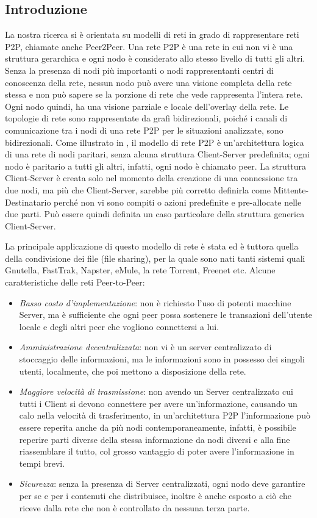 \subsection{Introduzione}
La nostra ricerca si è orientata su modelli di reti in grado di rappresentare reti \acf{P2P}, chiamate anche Peer2Peer. Una rete P2P è una rete in cui non vi è una struttura gerarchica e ogni nodo è considerato allo stesso livello di tutti gli altri. Senza la presenza di nodi più importanti o nodi rappresentanti centri di conoscenza della rete, nessun nodo può avere una visione completa della rete stessa e non può sapere se la porzione di rete che vede rappresenta l'intera rete. Ogni nodo quindi, ha una visione parziale e locale dell'overlay della rete. Le topologie di rete sono rappresentate da grafi bidirezionali, poiché i canali di comunicazione tra i nodi di una rete P2P per le situazioni analizzate, sono bidirezionali. Come illustrato in \cite{peertopeer-book}, il modello di rete P2P è un'architettura logica di una rete di nodi paritari, senza alcuna struttura Client-Server predefinita; ogni nodo è paritario a tutti gli altri, infatti, ogni nodo è chiamato peer. La struttura Client-Server è creata solo nel momento della creazione di una connessione tra due nodi, ma più che Client-Server, sarebbe più corretto definirla come Mittente-Destinatario perché non vi sono compiti o azioni predefinite e pre-allocate nelle due parti. Può essere quindi definita un caso particolare della struttura generica Client-Server.

La principale applicazione di questo modello di rete è stata ed è tuttora quella della condivisione dei file (file sharing), per la quale sono nati tanti sistemi quali Gnutella, FastTrak, Napster, eMule, la rete Torrent, Freenet etc.
Alcune caratteristiche delle reti Peer-to-Peer:
\begin{itemize}
	\item \textit{Basso costo d'implementazione}: non è richiesto l'uso di potenti macchine Server, ma è sufficiente che ogni peer possa sostenere le transazioni dell'utente locale e degli altri peer che vogliono connettersi a lui.
	\item \textit{Amministrazione decentralizzata}: non vi è un server centralizzato di stoccaggio delle informazioni, ma le informazioni sono in possesso dei singoli utenti, localmente, che poi mettono a disposizione della rete.
	\item \textit{Maggiore velocità di trasmissione}: non avendo un Server centralizzato cui tutti i Client si devono connettere per avere un'informazione, causando un calo nella velocità di trasferimento, in un'architettura \acs{P2P} l'informazione può essere reperita anche da più nodi contemporaneamente, infatti, è possibile reperire parti diverse della stessa informazione da nodi diversi e alla fine riassemblare il tutto, col grosso vantaggio di poter avere l'informazione in tempi brevi.
	\item \textit{Sicurezza}: senza la presenza di Server centralizzati, ogni nodo deve garantire per se e per i contenuti che distribuisce, inoltre è anche esposto a ciò che riceve dalla rete che non è controllato da nessuna terza parte. 
\end{itemize}

